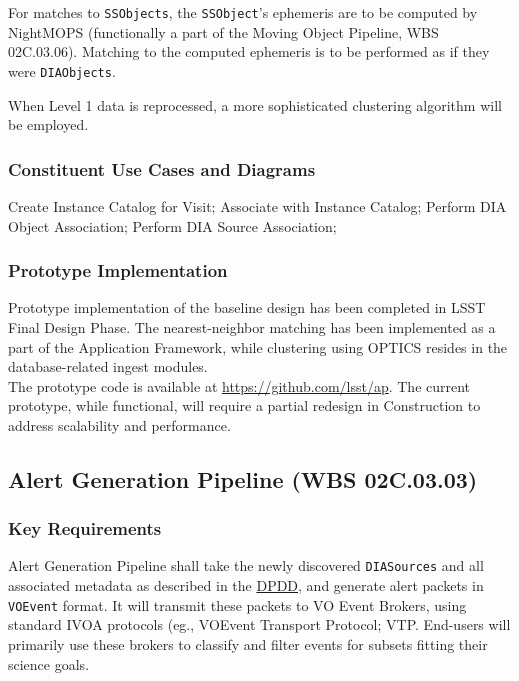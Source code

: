 \documentclass[12pt]{article}
\newcommand{\code}[1]{\texttt{#1}}
\newcommand{\DIASources}{\code{DIASources}\xspace}
\newcommand{\DIAObjects}{\code{DIAObjects}\xspace}
\newcommand{\SSObject}{\code{SSObject}\xspace}
\newcommand{\SSObjects}{\code{SSObjects}\xspace}
\newcommand{\VOEvent}{\code{VOEvent}\xspace}
\newcommand{\ds}[2]{{\color{blue} \href{https://docushare.lsstcorp.org/docushare/dsweb/Get/#1}{#2}}\xspace}
\newcommand{\DPDD}{\ds{LSE-163}{DPDD}}
\newcommand{\wbsAP}{WBS 02C.03.03}
\newcommand{\wbsMOPS}{WBS 02C.03.06}
\begin{document}
For matches to \SSObjects, the \SSObject's ephemeris are to be computed by NightMOPS (functionally a part of the Moving Object Pipeline, \wbsMOPS). Matching to the computed ephemeris is to be performed as if they were \DIAObjects.

When Level 1 data is reprocessed, a more sophisticated clustering algorithm \cite{Ankerst99} will be employed.

\subsubsection{Constituent Use Cases and Diagrams}

Create Instance Catalog for Visit; Associate with Instance Catalog;
Perform DIA Object Association; Perform DIA Source Association;

\subsubsection{Prototype Implementation}

Prototype implementation of the baseline design has been completed in LSST Final Design Phase. The nearest-neighbor matching has been implemented as a part of the Application Framework, while clustering using OPTICS resides in the database-related ingest modules.
\\

The prototype code is available at \url{https://github.com/lsst/ap}. The current prototype, while functional, will require a partial redesign in Construction to address scalability and performance.

\clearpage

\subsection{Alert Generation Pipeline (\wbsAP)}

\subsubsection{Key Requirements}

Alert Generation Pipeline shall take the newly discovered \DIASources and all associated metadata as described in the \DPDD, and generate alert packets in \VOEvent format. It will transmit these packets to VO Event Brokers, using standard IVOA protocols (eg., VOEvent Transport Protocol; VTP. End-users will primarily use these brokers to classify and filter events for subsets fitting their science goals.
\end{document}

